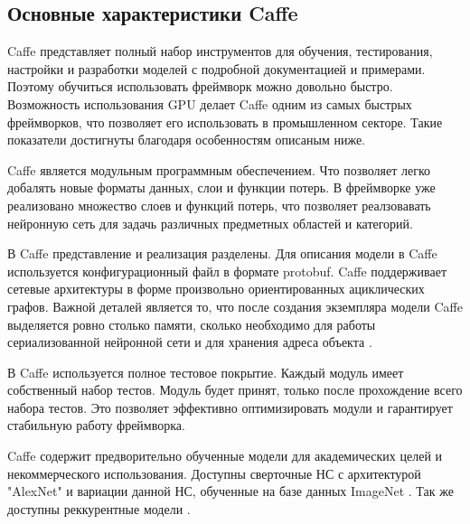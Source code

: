 \documentclass[a4paper,english,russian]{G2-105}
\begin{document}
\subsection{Основные характеристики Caffe}
\par Caffe представляет полный набор инструментов для обучения, тестирования, настройки и разработки моделей с подробной документацией и примерами. Поэтому обучиться использовать фреймворк можно довольно быстро. Возможность использования GPU делает Caffe одним из самых быстрых фреймворков, что позволяет его использовать в промышленном секторе. Такие показатели достигнуты благодаря особенностям описаным ниже.
\par Caffe является модульным программным обеспечением. Что позволяет легко добалять новые форматы данных, слои и функции потерь. В фреймворке уже реализовано множество слоев и функций потерь, что позволяет реалзовавать нейронную сеть для задачь различных предметных областей и категорий.
\par В Caffe представление и реализация разделены. Для описания модели в Caffe используется конфигурационный файл в формате protobuf. Caffe поддерживает сетевые архитектуры в форме произвольно ориентированных ациклических графов. Важной деталей является то, что после создания экземпляра модели Caffe выделяется ровно столько памяти, сколько необходимо для работы сериализованной нейронной сети и для хранения адреса объекта \cite{4}.
\par В Caffe используется полное тестовое покрытие. Каждый модуль имеет собственный набор тестов. Модуль будет принят, только после прохождение всего набора тестов. Это позволяет эффективно оптимизировать модули и гарантирует стабильную работу фреймворка.
\par Caffe содержит предворительно обученные модели для академических целей и некоммерческого использования. Доступны сверточные НС с архитектурой "AlexNet" и вариации данной НС, обученные на базе данных ImageNet \cite{ 5}. Так же доступны реккурентные модели \cite{6}.
\ttl
\end{document}
